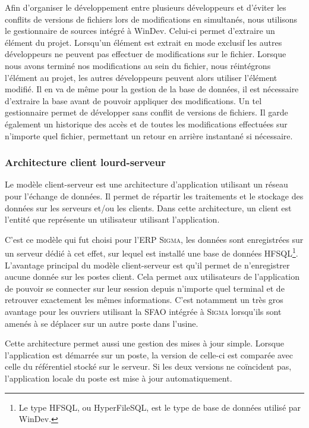 Afin d’organiser le développement entre plusieurs développeurs et d’éviter les conflits de versions de fichiers lors de modifications en simultanés, nous utilisons le gestionnaire de sources intégré à WinDev.
Celui-ci permet d’extraire un élément du projet.
Lorsqu’un élément est extrait en mode exclusif les autres développeurs ne peuvent pas effectuer de modifications sur le fichier.
Lorsque nous avons terminé nos modifications au sein du fichier, nous réintégrons l’élément au projet, les autres développeurs peuvent alors utiliser l’élément modifié.
Il en va de même pour la gestion de la base de données, il est nécessaire d’extraire la base avant de pouvoir appliquer des modifications.
Un tel gestionnaire permet de développer sans conflit de versions de fichiers.
Il garde également un historique des accès et de toutes les modifications effectuées sur n’importe quel fichier, permettant un retour en arrière instantané si nécessaire.

\subsubsection{Architecture client lourd-serveur}

Le modèle client-serveur est une architecture d'application utilisant un réseau pour l'échange de données.
Il permet de répartir les traitements et le stockage des données sur les serveurs et/ou les clients.
Dans cette architecture, un client est l'entité que représente un utilisateur utilisant l'application.

C'est ce modèle qui fut choisi pour l'ERP \textsc{Sigma}, les données sont enregistrées sur un serveur dédié à cet effet, sur lequel est installé une base de données HFSQL\footnote{Le type HFSQL, ou HyperFileSQL, est le type de base de données utilisé par WinDev.}.
L’avantage principal du modèle client-serveur est qu’il permet de n’enregistrer aucune donnée sur les postes client.
Cela permet aux utilisateurs de l’application de pouvoir se connecter sur leur session depuis n’importe quel terminal et de retrouver exactement les mêmes informations.
C'est notamment un très gros avantage pour les ouvriers utilisant la SFAO intégrée à \textsc{Sigma} lorsqu'ils sont amenés à se déplacer sur un autre poste dans l'usine.

Cette architecture permet aussi une gestion des mises à jour simple.
Lorsque l'application est démarrée sur un poste, la version de celle-ci est comparée avec celle du référentiel stocké sur le serveur.
Si les deux versions ne coïncident pas, l'application locale du poste est mise à jour automatiquement.

